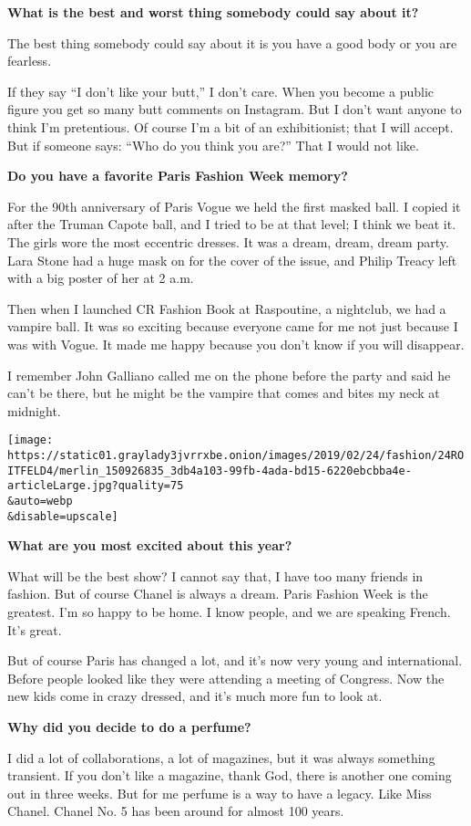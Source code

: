 \textbf{What is the best and worst thing somebody could say about it?}

The best thing somebody could say about it is you have a good body or
you are fearless.

If they say ``I don't like your butt,'' I don't care. When you become a
public figure you get so many butt comments on Instagram. But I don't
want anyone to think I'm pretentious. Of course I'm a bit of an
exhibitionist; that I will accept. But if someone says: ``Who do you
think you are?'' That I would not like.

\textbf{Do you have a favorite Paris Fashion Week memory?}

For the 90th anniversary of Paris Vogue we held the first masked ball. I
copied it after the Truman Capote ball, and I tried to be at that level;
I think we beat it. The girls wore the most eccentric dresses. It was a
dream, dream, dream party. Lara Stone had a huge mask on for the cover
of the issue, and Philip Treacy left with a big poster of her at 2 a.m.

Then when I launched CR Fashion Book at Raspoutine, a nightclub, we had
a vampire ball. It was so exciting because everyone came for me not just
because I was with Vogue. It made me happy because you don't know if you
will disappear.

I remember John Galliano called me on the phone before the party and
said he can't be there, but he might be the vampire that comes and bites
my neck at midnight.

\texttt{[image: https://static01.graylady3jvrrxbe.onion/images/2019/02/24/fashion/24ROITFELD4/merlin\_150926835\_3db4a103-99fb-4ada-bd15-6220ebcbba4e-articleLarge.jpg?quality=75\\\&auto=webp\\\&disable=upscale]}

\textbf{What are you most excited about this year?}

What will be the best show? I cannot say that, I have too many friends
in fashion. But of course Chanel is always a dream. Paris Fashion Week
is the greatest. I'm so happy to be home. I know people, and we are
speaking French. It's great.

But of course Paris has changed a lot, and it's now very young and
international. Before people looked like they were attending a meeting
of Congress. Now the new kids come in crazy dressed, and it's much more
fun to look at.

\textbf{Why did you decide to do a perfume?}

I did a lot of collaborations, a lot of magazines, but it was always
something transient. If you don't like a magazine, thank God, there is
another one coming out in three weeks. But for me perfume is a way to
have a legacy. Like Miss Chanel. Chanel No. 5 has been around for almost
100 years.


